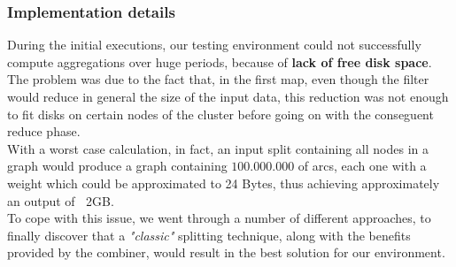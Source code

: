 \subsubsection{Implementation details}
During the initial executions, our testing environment
could not successfully compute aggregations over huge periods, because of \textbf{lack of free disk space}. \\
The problem was due to the fact that, in the first map, even though the filter would reduce in general the size of the input data,
this reduction was not enough to fit disks on certain nodes of the cluster before going on with the conseguent reduce phase.\\
With a worst case calculation, in fact, an input split containing all nodes in a graph would produce a graph containing $100.000.000$ of arcs, each one with a weight which could be approximated to 24 Bytes, thus achieving approximately an output of $~$ 2GB. \\
To cope with this issue, we went through a number of different approaches, to finally discover that a \emph{"classic"} splitting technique, along with the benefits provided by the combiner, would result in the best solution for our environment.
